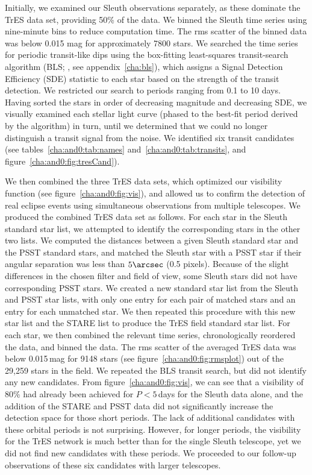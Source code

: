 Initially, we examined our Sleuth observations separately, as these dominate the TrES data set, providing 50\% of the data. We binned the Sleuth time series using nine-minute bins to reduce computation time. The rms scatter of the binned data was below 0.015 mag for approximately 7800 stars. We searched the time series for periodic transit-like dips using the box-fitting least-squares transit-search algorithm (BLS; \citealt*{Kovacs_Zucker_Mazeh:aa:2002a}, see appendix~\ref{cha:bls}), which assigns a Signal Detection Efficiency (SDE) statistic to each star based on the strength of the transit detection. We restricted our search to periods ranging from 0.1 to 10 days. Having sorted the stars in order of decreasing magnitude and decreasing SDE, we visually examined each stellar light curve (phased to the best-fit period derived by the algorithm) in turn, until we determined that we could no longer distinguish a transit signal from the noise. We identified six transit candidates (see tables~\ref{cha:and0:tab:names} and~\ref{cha:and0:tab:transits}, and figure~\ref{cha:and0:fig:tresCand}).

We then combined the three TrES data sets, which optimized our visibility function (see figure~\ref{cha:and0:fig:vis}), and allowed us to confirm the detection of real eclipse events using simultaneous observations from multiple telescopes. We produced the combined TrES data set as follows. For each star in the Sleuth standard star list, we attempted to identify the corresponding stars in the other two lists. We computed the distances between a given Sleuth standard star and the PSST standard stars, and matched the Sleuth star with a PSST star if their angular separation was less than $5\arcsec$ (0.5 pixels). Because of the slight differences in the chosen filter and field of view, some Sleuth stars did not have corresponding PSST stars. We created a new standard star list from the Sleuth and PSST star lists, with only one entry for each pair of matched stars and an entry for each unmatched star. We then repeated this procedure with this new star list and the STARE list to produce the TrES field standard star list. For each star, we then combined the relevant time series, chronologically reordered the data, and binned the data. The rms scatter of the averaged TrES data was below 0.015\,mag for 9148 stars (see figure~\ref{cha:and0:fig:rmsplot}) out of the 29,259 stars in the field. We repeated the BLS transit search, but did not identify any new candidates. From figure~\ref{cha:and0:fig:vis}, we can see that a visibility of 80\% had already been achieved for $P<5$\,days for the Sleuth data alone, and the addition of the STARE and PSST data did not significantly increase the detection space for those short periods. The lack of additional candidates with these orbital periods is not surprising. However, for longer periods, the visibility for the TrES network is much better than for the single Sleuth telescope, yet we did not find new candidates with these periods. We proceeded to our follow-up observations of these six candidates with larger telescopes.

